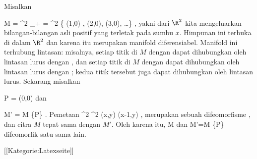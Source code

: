 Misalkan

\mavergleichskettedisp
{\vergleichskette
{M
}
{ =} { \R^2 \setminus \N_+
}
{ =} { \R^2 \setminus \{ (1,0) , (2,0), (3,0), \ldots  \}
}
{ } {
}
{ } {
}
}
{}{}{,}
yakni dari $\R^2$ kita mengeluarkan bilangan-bilangan asli positif yang terletak pada sumbu $x$. Himpunan ini terbuka di dalam $\R^2$ dan karena itu merupakan manifold diferensiabel. Manifold ini terhubung lintasan: misalnya, setiap titik di $M$ dengan
 dapat dihubungkan oleh lintasan lurus dengan
, dan setiap titik di $M$ dengan
 dapat dihubungkan oleh lintasan lurus dengan
; kedua titik tersebut juga dapat dihubungkan oleh lintasan lurus. Sekarang misalkan

\mavergleichskettedisp
{\vergleichskette
{P
}
{ =} { (0,0)
}
{ } {
}
{ } {
}
{ } {
}
}
{}{}{}
dan

\mavergleichskettedisp
{\vergleichskette
{M'
}
{ =} { M \setminus \{P\}
}
{ } {
}
{ } {
}
{ } {
}
}
{}{}{.}
Pemetaan
\maabbeledisp {} {\R^2} {\R^2
} {(x,y)} {(x-1,y)
} {,}
merupakan sebuah difeomorfisme
 {} {},
dan citra $M$ tepat sama dengan $M'$. Oleh karena itu,
\mathkor {} {M} {dan} {M'=M \setminus \{P\}} {}
difeomorfik satu sama lain.

 [[Kategorie:Latexseite]]

